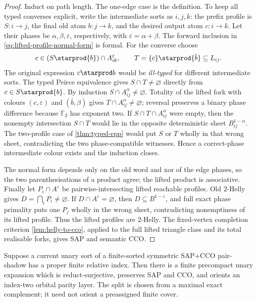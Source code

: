 \begin{proof}
Induct on path length. The one-edge case is the definition.
To keep all typed converses explicit, write the intermediate
sorts as $i,j,k$: the prefix profile is
$S:i\to j$, the final old atom $b:j\to k$,
and the desired output atom $c:i\to k$.
Let their phases be $\alpha,\beta,\varepsilon$,
respectively, with $\varepsilon=\alpha+\beta$.
The forward inclusion in
\eqref{eq:lifted-profile-normal-form} is formal.
For the converse choose
\[
 c\in(S\starprod\{b\})\cap A_{ik}^{\varepsilon},
 \qquad T=\{c\}\starprod\{\bar b\}
                 \subseteq L_{ij}.
\]
The original expression $c\starprod b$ would
be \emph{ill-typed} for different intermediate
sorts. The typed Peirce equivalence gives
$S\cap T\ne\varnothing$ directly from
$c\in S\starprod\{b\}$.
By induction $S\cap A_{ij}^{\alpha}\ne\varnothing$.
Totality of the lifted fork with colours
$(c,\varepsilon)$ and $(\bar b,\beta)$
gives $T\cap A_{ij}^{\alpha}\ne\varnothing$;
reversal preserves a binary phase difference
because $\mathbb F_2$ has exponent two.
If
$S\cap T\cap A_{ij}^{\alpha}$ were empty, then
the nonempty intersection $S\cap T$ would lie
in the opposite deterministic sheet
$B_{ij}^{1-\alpha}$.  The two-profile case of
\cref{thm:typed-epp} would put $S$ or $T$ wholly in that wrong sheet,
contradicting the two phase-compatible witnesses.  Hence a correct-phase
intermediate colour exists and the induction closes.

The normal form depends only on the old word and xor of the edge phases, so
the two parenthesisations of a product agree; the lifted product is
associative.  Finally let $P_i\cap A^{\varepsilon}$ be pairwise-intersecting
lifted reachable profiles.  Old $2$-Helly gives
$D=\bigcap_iP_i\ne\varnothing$.  If
$D\cap A^{\varepsilon}=\varnothing$, then
$D\subseteq B^{1-\varepsilon}$, and full exact phase primality puts one
$P_j$ wholly in the wrong sheet, contradicting nonemptiness of its lifted
profile. Thus the lifted profiles are $2$-Helly. The fixed-vertex
completion criterion \cref{lem:helly-to-cco}, applied to the full lifted
triangle class and its total realisable forks, gives SAP and semantic CCO.
\end{proof}

\begin{theorem}
\label{thm:safe-exact-split}
Suppose a current unary sort of a finite-sorted symmetric SAP+CCO pair-shadow
has a proper finite relative index.  Then there is a finite precompact unary
expansion which is reduct-surjective, preserves SAP and CCO, and orients an
index-two orbital parity layer.  The split is chosen from a maximal exact
complement; it need not orient a preassigned finite cover.
\end{theorem}


